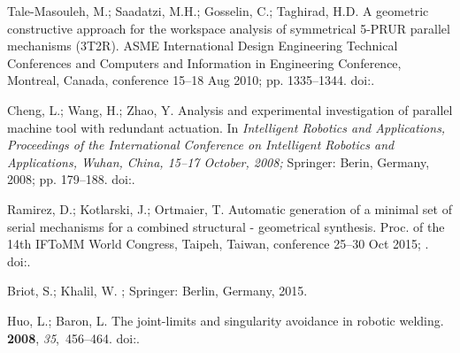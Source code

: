 \documentclass[robotics,article,accept,moreauthors,pdftex]{Definitions/mdpi}
\begin{document}
\begin{thebibliography}{999}
Tale-Masouleh, M.; Saadatzi, M.H.; Gosselin, C.; Taghirad, H.D.
\newblock A geometric constructive approach for the workspace analysis of
symmetrical 5-PRUR parallel mechanisms (3T2R).
\newblock  ASME International Design Engineering Technical Conferences and
Computers and Information in Engineering Conference, Montreal, Canada, conference 15--18 Aug 2010; pp. 1335--1344.
\newblock
doi:{\href{https://doi.org/10.1115/DETC2010-28509}{}}.

Cheng, L.; Wang, H.; Zhao, Y.
\newblock Analysis and experimental investigation of parallel machine tool with
  redundant actuation.
\newblock  In {\em Intelligent Robotics and Applications, Proceedings of the International Conference on Intelligent Robotics and Applications, Wuhan, China, 15--17 October, 2008;} Springer: Berin, Germany, 2008; pp. 179--188.
\newblock
  doi:{\href{https://doi.org/10.1007/978-3-540-88513-9_20}{}}.

Ramirez, D.; Kotlarski, J.; Ortmaier, T.
\newblock Automatic generation of a minimal set of serial mechanisms for a
  combined structural - geometrical synthesis.
\newblock  Proc. of the 14th IFToMM World Congress, Taipeh, Taiwan, conference 25--30 Oct 2015; .
\newblock
  doi:{\href{https://doi.org/10.6567/IFToMM.14TH.WC.OS13.047}{}}.

Briot, S.; Khalil, W.
; Springer: Berlin, Germany, 2015.

Huo, L.; Baron, L.
\newblock The joint-limits and singularity avoidance in robotic welding.
 {\bf 2008}, {\em
  35},~456--464.
\newblock
  doi:{\href{https://doi.org/10.1108/01439910810893626}{}}.

\end{thebibliography}
\end{document}
